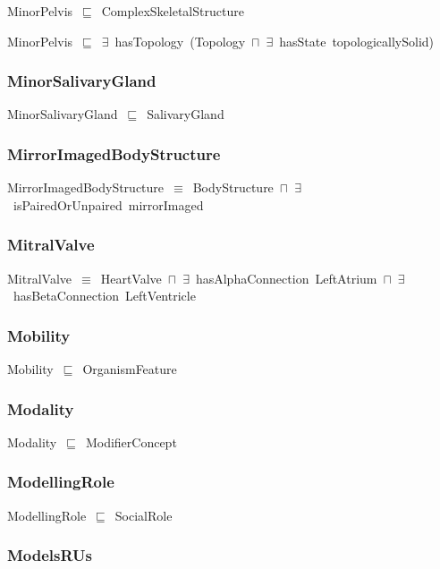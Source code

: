\documentclass{article}
\begin{document}
MinorPelvis~\ensuremath{\sqsubseteq}~ComplexSkeletalStructure~

MinorPelvis~\ensuremath{\sqsubseteq}~\ensuremath{\exists}~hasTopology~(Topology~\ensuremath{\sqcap}~\ensuremath{\exists}~hasState~topologicallySolid)~

\subsubsection*{MinorSalivaryGland}

MinorSalivaryGland~\ensuremath{\sqsubseteq}~SalivaryGland~

\subsubsection*{MirrorImagedBodyStructure}

MirrorImagedBodyStructure~\ensuremath{\equiv}~BodyStructure~\ensuremath{\sqcap}~\ensuremath{\exists}~isPairedOrUnpaired~mirrorImaged

\subsubsection*{MitralValve}

MitralValve~\ensuremath{\equiv}~HeartValve~\ensuremath{\sqcap}~\ensuremath{\exists}~hasAlphaConnection~LeftAtrium~\ensuremath{\sqcap}~\ensuremath{\exists}~hasBetaConnection~LeftVentricle

\subsubsection*{Mobility}

Mobility~\ensuremath{\sqsubseteq}~OrganismFeature~

\subsubsection*{Modality}

Modality~\ensuremath{\sqsubseteq}~ModifierConcept~

\subsubsection*{ModellingRole}

ModellingRole~\ensuremath{\sqsubseteq}~SocialRole~

\subsubsection*{ModelsRUs}
\end{document}
